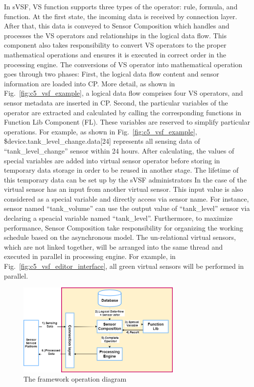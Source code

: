 In sVSF, VS function supports three types of the operator: rule, formula, and function. At the first state, the incoming data is received by connection layer. After that, this data is conveyed to Sensor Composition which handles and processes the VS operators and relationships in the logical data flow. This component also takes responsibility to convert VS operators to the proper mathematical operations and ensures it is executed in correct order in the processing engine. The conversions of VS operator into mathematical operation goes through two phases: First, the logical data flow content and sensor information are loaded into CP. More detail, as shown in Fig.~\ref{fig:c5_vsf_example}, a logical data flow comprises four VS operators, and sensor metadata are inserted in CP. Second, the particular variables of the operator are extracted and calculated by calling the corresponding functions in Function Lib Component (FL). These variables are reserved to simplify particular operations. For example, as shown in Fig.~\ref{fig:c5_vsf_example},  \$device.tank\_level\_change.data[24] represents all sensing data of “tank\_level\_change” sensor within 24 hours. After calculating, the values of special variables are added into virtual sensor operator before storing in temporary data storage in order to be reused in another stage. The lifetime of this temporary data can be set up by the sVSF administrators In the case of the virtual sensor has an input from another virtual sensor. This input value is also considered as a special variable and directly access via sensor name. For instance, sensor named “tank\_volume” can use the output value of “tank\_level” sensor via declaring a speacial variable named “tank\_level”. Furthermore, to maximize performance, Sensor Composition take responsibility for organizing the working schedule based on the asynchronous model. The un-relational virtual sensors, which are not linked together, will be arranged into the same thread and executed in parallel in processing engine. For example, in Fig.~\ref{fig:c5_vsf_editor_interface}, all green virtual sensors will be performed in parallel. \\

\begin{figure}[h!] 
 \begin{center} 
 \includegraphics[width=0.72\textwidth]{./Part2/Chapter5/figures/vsf_operation_diagram.png} 
    \caption{The framework operation diagram}
     \label{fig:c5_vsf_operation_diagram}
  \end{center} 
\end{figure}

